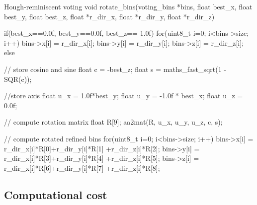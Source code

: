 \begin{code}[colback=white, label=algo:rotation]{Hough-reminiscent voting}
void rotate_bins(voting_bins *bins, float best_x, 
						float best_y, float best_z, 
						float *r_dir_x, float *r_dir_y, 
						float *r_dir_z)
{
	if(best_x==0.0f, best_y==0.0f, best_z==-1.0f){
		for(uint8_t i=0; i<bins->size; i++){
			bins->x[i] = r_dir_x[i];
			bins->y[i] = r_dir_y[i];
			bins->z[i] = r_dir_z[i];
		} 
	}
	else{
		// store cosine and sine
		float c = -best_z;
		float s = maths_fast_sqrt(1 - SQR(c)); 

		//store axis
		float u_x = 1.0f*best_y;					
		float u_y = -1.0f * best_x;					
		float u_z = 0.0f;

		// compute rotation matrix
		float R[9];
		aa2mat(R, u_x, u_y, u_z, c, s);

		// compute rotated refined bins
		for(uint8_t i=0; i<bins->size; i++){
			bins->x[i] = r_dir_x[i]*R[0]+r_dir_y[i]*R[1]
							+r_dir_z[i]*R[2];
			bins->y[i] = r_dir_x[i]*R[3]+r_dir_y[i]*R[4]
							+r_dir_z[i]*R[5];
			bins->z[i] = r_dir_x[i]*R[6]+r_dir_y[i]*R[7]
							+r_dir_z[i]*R[8];
		} 
	}
}
\end{code}

\subsection{Computational cost}


\newpage